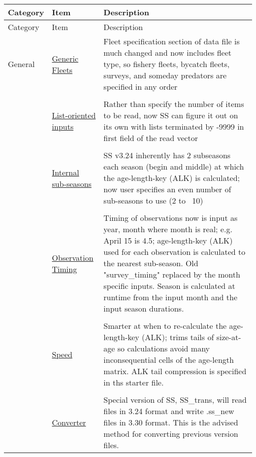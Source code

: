 		\begin{center}
			\begin{longtable}{p{2cm} p{3cm} p{10cm}}
				Category & Item & Description\\
				\hline
				\endfirsthead
		
				Category & Item & Description\\
				\hline
				\endhead
		
				\hline
				\endfoot
		
				\endlastfoot
				
				General & 
					\hyperlink{GenericFleets}{Generic Fleets} & 
						Fleet specification section of data file is much changed and now includes fleet type, so fishery fleets, bycatch fleets, surveys, and someday predators are specified in any order\\
				  \\
				  & \hyperlink{ListBased}{List-oriented inputs} & 
					    Rather than specify the number of items to be read, now SS can figure it out on its own with lists terminated by -9999 in first field of the read vector \\
				  \\					  
				  & \hyperlink{SubSeas}{Internal sub-seasons} & 
					    SS v3.24 inherently has 2 subseasons each season (begin and middle) at which the age-length-key (ALK) is calculated; now user specifies an even number of sub-seasons to use (2 to ~10) \\
				  \\
				  & \hyperlink{ObsTiming}{Observation Timing} & 
					    Timing of observations now is input as year, month where month is real; e.g. April 15 is 4.5; age-length-key (ALK) used for each observation is calculated to the nearest sub-season.  Old "survey\_timing" replaced by the month specific inputs.  Season is calculated at runtime from the input month and the input season durations. \\
				  \\
				  & \hyperlink{ALK}{Speed} & 
					    Smarter at when to re-calculate the age-length-key (ALK); trims tails of size-at-age so calculations avoid many inconsequential cells of the age-length matrix. ALK tail compression is specified in ths starter file.\\
				  \\				
				  & \hyperlink{Convert} {Converter} & 
					    Special version of SS, SS\_trans, will read files in 3.24 format and write .ss\_new files in 3.30 format.  This is the advised method for converting previous version files.\\

\end{longtable}
\end{center}
